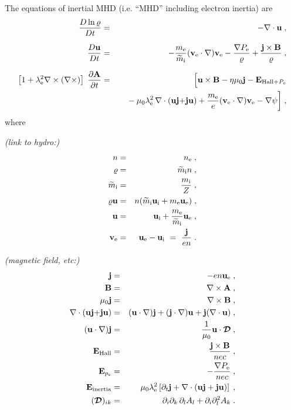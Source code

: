 \documentclass[\mydriver,12pt,twoside,notitlepage,letterpaper]{article}
\newcommand{\matx}[1]{\mbox{\boldmath${\cal #1}$\unboldmath}}
\newcommand{\tensor}[1]{\matx{#1}}
\newcommand{\Av}      {\mathbf{A}}
\newcommand{\Bv}      {\mathbf{B}}
\newcommand{\Ev}      {\mathbf{E}}
\newcommand{\jv}      {\mathbf{j}}
\newcommand{\mtildei} {\widetilde{m}_{\rm i}}
\newcommand{\uv}      {\mathbf{u}}
\newcommand{\uve}     {\uv_{\rm e}}
\newcommand{\uvi}     {\uv_{\rm i}}
\newcommand{\vv}      {\mathbf{v}}
\newcommand{\vve}     {\vv_{\rm e}}
\begin{document}
The equations of inertial MHD (i.e. ``MHD'' including electron inertia)
are
\begin{eqnarray}
  \dfrac{D\ln\varrho}{Dt}
  &=& - \nabla\cdot\uv \; , \\[1.5ex]
  \dfrac{D\uv}{Dt}
  &=& - \dfrac{m_{\rm e}}
              {\mtildei}
        (\vve\cdot\nabla)\vve
      - \dfrac{\nabla P_{\rm e}}
              {\varrho}
      + \dfrac{\jv \times \Bv}
              {\varrho} \; , \\[1.5ex]
  \left[ 1 +\lambda_{\rm e}^2 \nabla\times (\nabla\times)
  \right] \;
  \dfrac{\partial \Av}{\partial t}
  &=& \Bigl[ \uv\times\Bv
             - \eta\mu_0\jv
             - \Ev_{\rm Hall+\mathit{P}_e} \nonumber \\
  & &        \quad{}
             - \mu_0 \lambda_{\rm e}^2\, \nabla\cdot(\uv\jv {+} \jv\uv)
             + \dfrac{m_{\rm e}}{e} (\vve\cdot\nabla)\vve
             - \nabla\psi
      \biggr] \; ,
\end{eqnarray}
%
where

\emph{(link to hydro:)}
\begin{eqnarray}
  n                &=& n_{\rm e} \; , \\
  \varrho          &=& \mtildei n \; , \\
  \mtildei         &=& \dfrac{m_{\rm i}}{Z} \; , \\
  \varrho\uv       &=& n ( \mtildei \uvi + m_{\rm e} \uve ) \; , \\
  \uv              &=& \uvi + \dfrac{m_{\rm e}}{\mtildei} \uve \; , \\
  \vve             &=& \uv_{\rm e} - \uv_{\rm i}
                       \ = \ \dfrac{\jv}{en} \; .
\end{eqnarray}

\emph{(magnetic field, etc:)}
\begin{eqnarray}
  \jv              &=& - e n \uve \; , \\
  \Bv              &=& \nabla\times\Av \; , \\
  \mu_0 \jv        &=& \nabla\times\Bv \; , \\
  \nabla\cdot(\uv\jv {+} \jv\uv)
                   &=& (\uv\cdot\nabla)\jv
                       + (\jv\cdot\nabla)\uv
                       + \jv(\nabla\cdot\uv)\; , \\
  (\uv\cdot\nabla)\jv
                   &=& \dfrac{1}{\mu_0} \uv\cdot \tensor{D} \; , \\
  \Ev_{\rm Hall}   &=& \dfrac{\jv\times\Bv}{n e c} \; , \\
  \Ev_{p_{\rm e}}  &=& - \dfrac{\nabla P_{\rm e}}{n e c} \; , \\
  \Ev_{\rm inertia}
  &=&  \mu_0 \lambda_{\rm e}^2
      \left[
        \partial_t \jv
        + \nabla\cdot(\uv \jv + \jv \uv)
      \right] \; , \\
  (\tensor{D})_{ik}
                   &=& \partial_i\partial_k\, \partial_l A_l
                       + \partial_i \partial_l^2 A_k \; . \\ 
\end{eqnarray}
\end{document}
